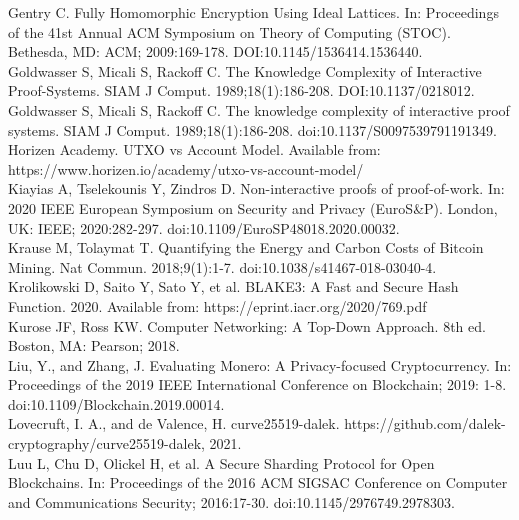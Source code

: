 \documentclass[10pt,a4paper,twocolumn]{article}
\begin{document}
Gentry C. Fully Homomorphic Encryption Using Ideal Lattices. In: Proceedings of the 41st Annual ACM Symposium on Theory of Computing (STOC). Bethesda, MD: ACM; 2009:169-178. DOI:10.1145/1536414.1536440.\\

Goldwasser S, Micali S, Rackoff C. The Knowledge Complexity of Interactive Proof-Systems. SIAM J Comput. 1989;18(1):186-208. DOI:10.1137/0218012.\\

Goldwasser S, Micali S, Rackoff C. The knowledge complexity of interactive proof systems. SIAM J Comput. 1989;18(1):186-208. doi:10.1137/S0097539791191349.\\

Horizen Academy. UTXO vs Account Model. Available from: https://www.horizen.io/academy/utxo-vs-account-model/ \\

Kiayias A, Tselekounis Y, Zindros D. Non-interactive proofs of proof-of-work. In: 2020 IEEE European Symposium on Security and Privacy (EuroS\&P). London, UK: IEEE; 2020:282-297. doi:10.1109/EuroSP48018.2020.00032.\\

Krause M, Tolaymat T. Quantifying the Energy and Carbon Costs of Bitcoin Mining. Nat Commun. 2018;9(1):1-7. doi:10.1038/s41467-018-03040-4.\\

Krolikowski D, Saito Y, Sato Y, et al. BLAKE3: A Fast and Secure Hash Function. 2020. Available from: https://eprint.iacr.org/2020/769.pdf\\

Kurose JF, Ross KW. Computer Networking: A Top-Down Approach. 8th ed. Boston, MA: Pearson; 2018.\\

Liu, Y., and Zhang, J. Evaluating Monero: A Privacy-focused Cryptocurrency. In: Proceedings of the 2019 IEEE International Conference on Blockchain; 2019: 1-8. doi:10.1109/Blockchain.2019.00014.\\

Lovecruft, I. A., and de Valence, H. curve25519-dalek. https://github.com/dalek-cryptography/curve25519-dalek, 2021.\\

Luu L, Chu D, Olickel H, et al. A Secure Sharding Protocol for Open Blockchains. In: Proceedings of the 2016 ACM SIGSAC Conference on Computer and Communications Security; 2016:17-30. doi:10.1145/2976749.2978303.\\
\end{document}
